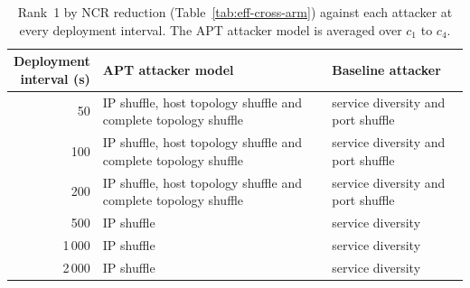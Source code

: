 \begin{table}[htbp]
  \centering
  \caption[Rank 1 against each attacker at every deployment interval]{Rank~1 by NCR reduction (Table~\ref{tab:eff-cross-arm}) against each attacker at every deployment interval. The APT attacker model is averaged over $c_1$ to $c_4$.}
  \label{tab:rank-one-intervals}
  \tablestyle\setlength{\tabcolsep}{4pt}
  \begin{tabular}{@{}r>{\raggedright\arraybackslash}p{7.8cm}>{\raggedright\arraybackslash}p{5.4cm}@{}}
    \toprule
    \shortstack{Deployment\\interval (s)} & APT attacker model & Baseline attacker \\
    \midrule
    50 & IP shuffle, host topology shuffle and complete topology shuffle & service diversity and port shuffle \\
    100 & IP shuffle, host topology shuffle and complete topology shuffle & service diversity and port shuffle \\
    200 & IP shuffle, host topology shuffle and complete topology shuffle & service diversity and port shuffle \\
    500 & IP shuffle & service diversity \\
    1\,000 & IP shuffle & service diversity \\
    2\,000 & IP shuffle & service diversity \\
    \bottomrule
  \end{tabular}
\end{table}
